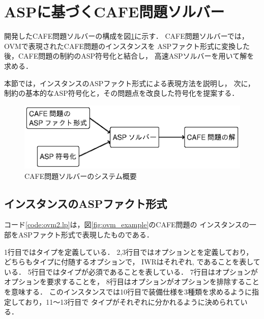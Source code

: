 \section{ASPに基づくCAFE問題ソルバー}

開発したCAFE問題ソルバーの構成を図\ref{fig:system}に示す．
CAFE問題ソルバーでは，OVMで表現されたCAFE問題のインスタンスを
ASPファクト形式に変換した後，CAFE問題の制約のASP符号化と結合し，
高速ASPソルバーを用いて解を求める．

本節では，インスタンスのASPファクト形式による表現方法を説明し，
次に，制約の基本的なASP符号化と，その問題点を改良した符号化を提案する．

\begin{figure}[tb]
 \includegraphics [width=\linewidth]{images/system.eps}
 \caption{CAFE問題ソルバーのシステム概要}
 \label{fig:system}
\end{figure}

\subsection{インスタンスのASPファクト形式}
 

コード\ref{code:ovm2.lp}は，図\ref{fig:ovm_example}のCAFE問題の
インスタンスの一部をASPファクト形式で表現したものである．

1行目ではタイプを定義している．
2,3行目ではオプションとを定義しており，
どちらもタイプに付随するオプションで，
IWRはそれぞれ, であることを表している．
5行目ではタイプが必須であることを表している．
7行目はオプションがオプションを要求することを，
8行目はオプションがオプションを排除することを意味する．
このインスタンスでは10行目で装備仕様を3種類を求めるように指定しており，11〜13行目で
タイプがそれぞれに分かれるように決められている．

